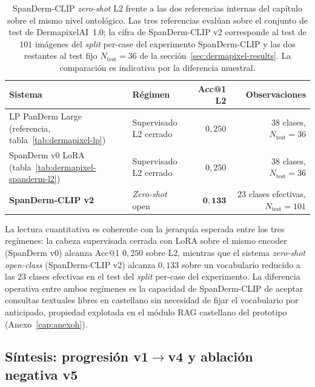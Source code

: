 \begin{table}[H]
\centering
\footnotesize
\setlength{\tabcolsep}{4pt}
\renewcommand{\arraystretch}{0.95}
\caption{SpanDerm-CLIP \emph{zero-shot} L2 frente a las dos
referencias internas del capítulo sobre el mismo nivel ontológico.
Las tres referencias evalúan sobre el conjunto de test de
DermapixelAI~1.0; la cifra de SpanDerm-CLIP v2 corresponde al
test de $101$ imágenes del \emph{split} per-case del experimento
SpanDerm-CLIP y las dos restantes al test fijo
$N_{\mathrm{test}} = 36$ de la secci\'on~\ref{sec:dermapixel-results}.
La comparación es indicativa por la diferencia muestral.}
\label{tab:spanderm-l2-ceiling}
\begin{tabular}{llrr}
\hline
Sistema                                                 & Régimen               & Acc@1 L2          & Observaciones \\
\hline
LP PanDerm Large (referencia, tabla~\ref{tab:dermapixel-lp}) & Supervisado L2 cerrado & $0{,}250$        & $38$ clases, $N_{\mathrm{test}} = 36$ \\
SpanDerm v0 LoRA (tabla~\ref{tab:dermapixel-spanderm-l2}) & Supervisado L2 cerrado & $0{,}250$        & $38$ clases, $N_{\mathrm{test}} = 36$ \\
\textbf{SpanDerm-CLIP v2}                                & \emph{Zero-shot} open  & $\mathbf{0{,}133}$ & $23$ clases efectivas, $N_{\mathrm{test}} = 101$ \\
\hline
\end{tabular}
\end{table}

La lectura cuantitativa es coherente con la jerarquía esperada
entre los tres regímenes: la cabeza supervisada cerrada con LoRA
sobre el mismo encoder (SpanDerm v0) alcanza Acc@1 $0{,}250$
sobre L2, mientras que el sistema \emph{zero-shot open-class}
(SpanDerm-CLIP v2) alcanza $0{,}133$ sobre un vocabulario reducido
a las $23$ clases efectivas en el test del \emph{split}
per-case del experimento. La diferencia operativa entre ambos
regímenes es la capacidad de SpanDerm-CLIP de aceptar consultas
textuales libres en castellano sin necesidad de fijar el
vocabulario por anticipado, propiedad explotada en el módulo
RAG castellano del prototipo (Anexo~\ref{cap:anexoh}).

\subsection*{Síntesis: progresión v1$\to$v4 y ablación negativa v5}

